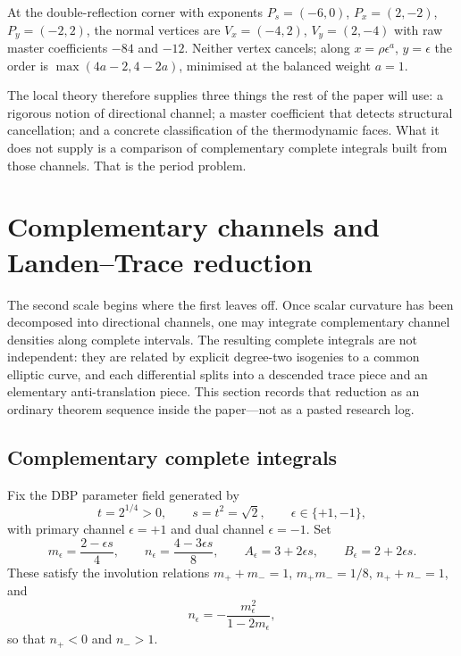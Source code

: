 \documentclass[11pt,a4paper]{article}
\theoremstyle{definition}
\theoremstyle{remark}
\begin{document}
At the double-reflection corner with exponents
\(P_s=(-6,0)\), \(P_x=(2,-2)\), \(P_y=(-2,2)\), the normal vertices are
\(V_x=(-4,2)\), \(V_y=(2,-4)\) with raw master coefficients \(-84\) and \(-12\).
Neither vertex cancels; along \(x=\rho\epsilon^a\), \(y=\epsilon\) the order is
\(\max(4a-2,4-2a)\), minimised at the balanced weight \(a=1\).

The local theory therefore supplies three things the rest of the paper will
use: a rigorous notion of directional channel; a master coefficient that
detects structural cancellation; and a concrete classification of the
thermodynamic faces. What it does not supply is a comparison of complementary
complete integrals built from those channels. That is the period problem.

\section{Complementary channels and Landen--Trace reduction}
\label{sec:periods}

The second scale begins where the first leaves off. Once scalar curvature has
been decomposed into directional channels, one may integrate complementary
channel densities along complete intervals. The resulting complete integrals
are not independent: they are related by explicit degree-two isogenies to a
common elliptic curve, and each differential splits into a descended trace
piece and an elementary anti-translation piece. This section records that
reduction as an ordinary theorem sequence inside the paper---not as a pasted
research log.

\subsection{Complementary complete integrals}

Fix the DBP parameter field generated by
\[
t=2^{1/4}>0,
\qquad
s=t^2=\sqrt2,
\qquad
\epsilon\in\{+1,-1\},
\]
with primary channel \(\epsilon=+1\) and dual channel \(\epsilon=-1\). Set
\begin{equation}
m_\epsilon=\frac{2-\epsilon s}{4},
\qquad
n_\epsilon=\frac{4-3\epsilon s}{8},
\qquad
A_\epsilon=3+2\epsilon s,
\qquad
B_\epsilon=2+2\epsilon s.
\label{eq:dbp-params}
\end{equation}
These satisfy the involution relations
\(m_++m_-=1\), \(m_+m_-=1/8\), \(n_++n_-=1\), and
\begin{equation}
n_\epsilon=-\frac{m_\epsilon^2}{1-2m_\epsilon},
\label{eq:nfromm}
\end{equation}
so that \(n_+<0\) and \(n_->1\).
\end{document}
